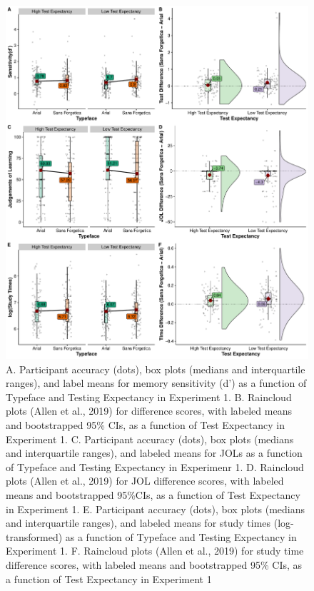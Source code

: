\documentclass[
  english,
  jou]{apa7}
\begin{document}
\begin{figure}

{\centering \includegraphics{Testing_Expectancy_SF_RR_files/figure-latex/unnamed-chunk-19-1} 

}

\caption{A. Participant accuracy (dots), box plots (medians and interquartile ranges), and label means for memory sensitivity (d') as a function of Typeface and Testing Expectancy in Experiment 1. B. Raincloud plots (Allen et al., 2019) for difference scores, with labeled means and bootstrapped 95\% CIs, as a function of Test Expectancy in Experiment 1. C. Participant accuracy (dots), box plots (medians and interquartile ranges), and labeled means for JOLs as a function of Typeface and Testing Expectancy in Experimenr 1. D. Raincloud plots (Allen et al., 2019) for JOL difference scores, with labeled means and bootstrapped 95\%CIs, as a function of Test Expectancy in Experiment 1. E. Participant accuracy (dots), box plots (medians and interquartile ranges), and labeled means for study times (log-transformed) as a function of Typeface and Testing Expectancy in Experiment 1. F. Raincloud plots (Allen et al., 2019) for study time difference scores, with labeled means and bootstrapped 95\% CIs, as a function of Test Expectancy in Experiment 1}\label{fig:unnamed-chunk-19}
\end{figure}
\end{document}
